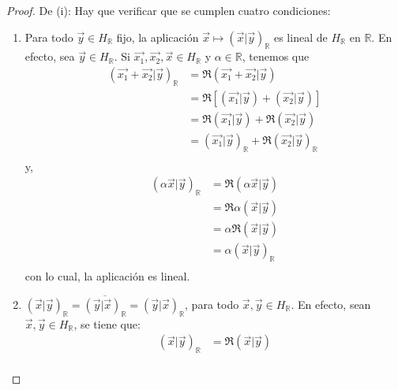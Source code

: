 \documentclass[12pt]{report}
\newcounter{it}
\theoremstyle{largebreak}
\newcommand\pint[2]{\ensuremath{\left(#1\big|#2\right)}}
\newcommand\conj[1]{\ensuremath{\overline{#1}}}
\begin{document}
    \begin{proof}
        De (i): Hay que verificar que se cumplen cuatro condiciones:
        \begin{enumerate}
            \item Para todo $\vec{y}\in H_{\mathbb{R}}$ fijo, la aplicación $\vec{x} \mapsto\pint{\vec{x}}{\vec{y}}_{\mathbb{R}}$ es lineal de $H_{\mathbb{R}}$ en $\mathbb{R}$. En efecto, sea $\vec{y}\in H_{\mathbb{R}}$. Si $\vec{x_1},\vec{x_2},\vec{x} \in H_{\mathbb{R}}$ y $\alpha\in\mathbb{R}$, tenemos que
            \begin{equation*}
                \begin{split}
                    \pint{\vec{x_1}+\vec{x_2}}{\vec{y}}_{\mathbb{R}}&=\Re\pint{\vec{x_1}+\vec{x_2}}{\vec{y}}\\
                    &=\Re[\pint{\vec{x_1}}{\vec{y}}+\pint{\vec{x_2}}{\vec{y}}]\\
                    &=\Re\pint{\vec{x_1}}{\vec{y}}+\Re\pint{\vec{x_2}}{\vec{y}}\\
                    &=\pint{\vec{x_1}}{\vec{y}}_{\mathbb{R}}+\Re\pint{\vec{x_2}}{\vec{y}}_{\mathbb{R}}\\
                \end{split}
            \end{equation*}
            y,
            \begin{equation*}
                \begin{split}
                    \pint{\alpha\vec{x}}{\vec{y}}_{\mathbb{R}}&=\Re\pint{\alpha\vec{x}}{\vec{y}}\\
                    &=\Re\alpha\pint{\vec{x}}{\vec{y}}\\
                    &=\alpha\Re\pint{\vec{x}}{\vec{y}}\\
                    &=\alpha\pint{\vec{x}}{\vec{y}}_{\mathbb{R}}\\
                \end{split}
            \end{equation*}
            con lo cual, la aplicación es lineal.
            \item $\pint{\vec{x}}{\vec{y}}_{\mathbb{R}}=\conj{\pint{\vec{y}}{\vec{x}}_{\mathbb{R}}}=\pint{\vec{y}}{\vec{x}}_{\mathbb{R}}$, para todo $\vec{x},\vec{y}\in H_{\mathbb{R}}$. En efecto, sean $\vec{x},\vec{y}\in H_{\mathbb{R}}$, se tiene que:
            \begin{equation*}
                \begin{split}
                    \pint{\vec{x}}{\vec{y}}_{\mathbb{R}}&=\Re\pint{\vec{x}}{\vec{y}} \\

\end{split}
\end{equation*}
\end{enumerate}
\end{proof}
\end{document}
